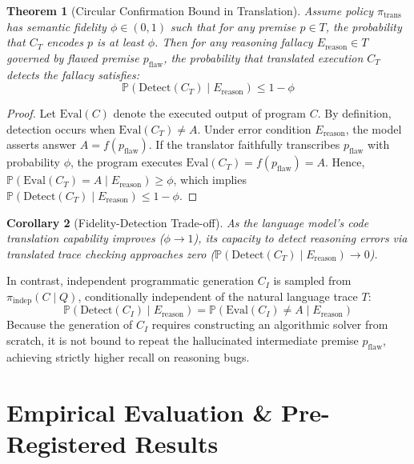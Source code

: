 \documentclass[11pt,a4paper]{article}
\newtheorem{theorem}{Theorem}
\newtheorem{corollary}[theorem]{Corollary}
\begin{document}
\begin{theorem}[Circular Confirmation Bound in Translation]
\label{thm:circular}
Assume policy $\pi_{\text{trans}}$ has semantic fidelity $\phi \in (0, 1)$ such that for any premise $p \in T$, the probability that $C_T$ encodes $p$ is at least $\phi$. Then for any reasoning fallacy $E_{\text{reason}} \in T$ governed by flawed premise $p_{\text{flaw}}$, the probability that translated execution $C_T$ detects the fallacy satisfies:
\begin{equation}
\mathbb{P}(\text{Detect}(C_T) \mid E_{\text{reason}}) \le 1 - \phi
\end{equation}
\end{theorem}

\begin{proof}
Let $\text{Eval}(C)$ denote the executed output of program $C$. By definition, detection occurs when $\text{Eval}(C_T) \neq A$. Under error condition $E_{\text{reason}}$, the model asserts answer $A = f(p_{\text{flaw}})$. If the translator faithfully transcribes $p_{\text{flaw}}$ with probability $\phi$, the program executes $\text{Eval}(C_T) = f(p_{\text{flaw}}) = A$. Hence, $\mathbb{P}(\text{Eval}(C_T) = A \mid E_{\text{reason}}) \ge \phi$, which implies $\mathbb{P}(\text{Detect}(C_T) \mid E_{\text{reason}}) \le 1 - \phi$.
\end{proof}

\begin{corollary}[Fidelity-Detection Trade-off]
As the language model's code translation capability improves ($\phi \to 1$), its capacity to detect reasoning errors via translated trace checking approaches zero ($\mathbb{P}(\text{Detect}(C_T) \mid E_{\text{reason}}) \to 0$).
\end{corollary}

In contrast, independent programmatic generation $C_I$ is sampled from $\pi_{\text{indep}}(C \mid Q)$, conditionally independent of the natural language trace $T$:
\begin{equation}
\mathbb{P}(\text{Detect}(C_I) \mid E_{\text{reason}}) = \mathbb{P}(\text{Eval}(C_I) \neq A \mid E_{\text{reason}})
\end{equation}
Because the generation of $C_I$ requires constructing an algorithmic solver from scratch, it is not bound to repeat the hallucinated intermediate premise $p_{\text{flaw}}$, achieving strictly higher recall on reasoning bugs.

\section{Empirical Evaluation \& Pre-Registered Results}
\end{document}
